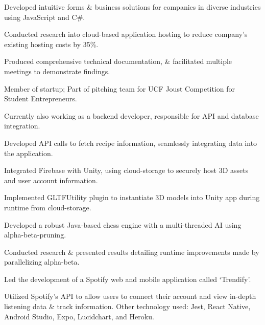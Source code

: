 \documentclass[]{deedy-resume-openfont}
\begin{document}
\begin{tightemize}
\item Developed intuitive forms \& business solutions for companies in diverse industries using JavaScript and C\#.
\item Conducted research into cloud-based application hosting to reduce company's existing hosting costs by 35\%.
\item Produced comprehensive technical documentation, \& facilitated multiple meetings to demonstrate findings.
\end{tightemize}



\begin{tightemize}
\item Member of startup; Part of pitching team for UCF Joust Competition for Student Entrepreneurs. 
\item Currently also working as a backend developer, responsible for API and database integration. 
\item Developed API calls to fetch recipe information, seamlessly integrating data into the application.
\item Integrated Firebase with Unity, using cloud-storage to securely host 3D assets and user account information.
\item Implemented GLTFUtility plugin to instantiate 3D models into Unity app during runtime from cloud-storage.
\end{tightemize}
\vspace{8pt}

\begin{tightemize}
\item Developed a robust Java-based chess engine with a multi-threaded AI using alpha-beta-pruning. 
\item Conducted research \& presented results detailing runtime improvements made by parallelizing alpha-beta.
\end{tightemize}
\sectionsep

\begin{tightemize}
\item Led the development of a Spotify web and mobile application called ‘Trendify’. 
\item Utilized Spotify’s API to allow users to connect their account and view in-depth listening data \& track information. Other technology used: Jest, React Native, Android Studio, Expo, Lucidchart, and Heroku.
\end{tightemize}
\end{document}
